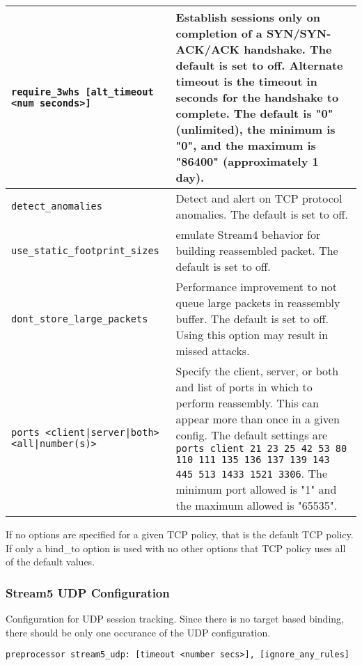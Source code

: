 \documentclass[english]{report}
\newenvironment{note}{
\samepage
    \vspace{10pt}{\textsf{
        {\hspace{7pt}\Huge{$\triangle$\hspace{-12.5pt}{\Large{$^!$}}}}\hspace{5pt}
        {\Large{NOTE}}
    }
    }
   \begin{center}
    \par\vspace{-17pt}

    \begin{lrbox}{\savepar}
    \begin{minipage}[r]{6in}
}
{
    \end{minipage}
    \end{lrbox}
    \fbox{
        \usebox{
            \savepar
	}
    }
    \par\vskip10pt
    \end{center}
}
\begin{document}
\begin{tabular}{| l | p{3.5in} |}
\hline
\texttt{require\_3whs [alt\_timeout <num seconds>]} & Establish sessions only on completion of a SYN/SYN-ACK/ACK handshake.  The default is set to off.  Alternate timeout is the timeout in seconds for the handshake to complete.  The default is "0" (unlimited), the minimum is "0", and the maximum is "86400" (approximately 1 day).\\
\hline
\texttt{detect\_anomalies} & Detect and alert on TCP protocol anomalies.  The default is set to off.\\
\hline
\texttt{use\_static\_footprint\_sizes} & emulate Stream4 behavior for building reassembled packet.  The default is set to off.\\
\hline
\texttt{dont\_store\_large\_packets} & Performance improvement to not queue large packets in reassembly buffer.  The default is set to off.  Using this option may result in missed attacks.\\
\hline
\texttt{ports <client|server|both> <all|number(s)>} & 
Specify the client, server, or both and list of ports in which to perform reassembly.  This can appear more than once in a given config.  The default settings are \texttt{ports client 21 23 25 42 53 80 110 111 135 136 137 139 143 445 513 1433 1521 3306}.  The minimum port allowed is "1" and the maximum allowed is "65535".\\
\hline
\end{tabular}

\begin{note}
If no options are specified for a given TCP policy, that is the default
TCP policy.  If only a bind\_to option is used with no other options that
TCP policy uses all of the default values.
\end{note}

\subsubsection{Stream5 UDP Configuration}

Configuration for UDP session tracking.  Since there is no target based
binding, there should be only one occurance of the UDP configuration.

\begin{verbatim}
preprocessor stream5_udp: [timeout <number secs>], [ignore_any_rules]
\end{verbatim}
\end{document}

